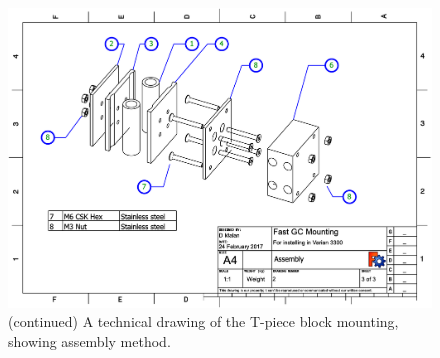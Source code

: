\begin{figure}
	\ContinuedFloat
	\centering
	\includegraphics[angle=90, origin=c, scale=0.75]{Figures/CarDrawing3.pdf}
	\decoRule	
	
	\caption[]{(continued) A technical drawing of the T-piece block mounting, showing assembly method.} 
	
\end{figure}


